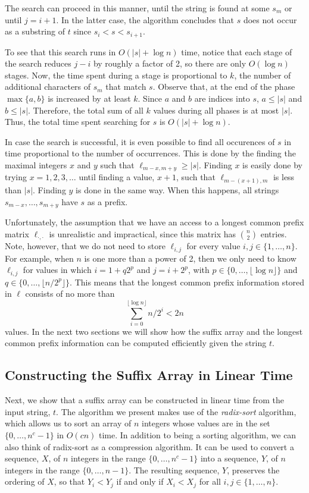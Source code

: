 The search can proceed in this manner, until the string is found at some
$s_m$ or until $j = i+1$. In the latter case, the algorithm concludes
that $s$ does not occur as a substring of $t$ since $s_{i} <s <s_{i+1}$.

To see that this search runs in $O(|s|+\log n)$ time, notice that each stage of the search reduces $j-i$ by roughly a factor of 2, so there are only $O(\log n)$ stages.  Now, the time spent during a stage is proportional to $k$, the number of additional characters of $s_m$ that match $s$.  Observe that, at the end of the phase $\max\{a,b\}$ is increased by at least $k$.  Since $a$ and $b$ are indices into $s$, $a\le|s|$ and $b\le|s|$. Therefore, the total sum of all $k$ values during all phases is at most $|s|$.  Thus, the total time spent searching for $s$ is $O(|s|+\log n)$.

In case the search is successful, it is even possible to find all
occurences of $s$ in time proportional to the number of occurrences.
This is done by the finding the maximal integers $x$ and $y$
such that $\ell_{m-x,m+y} \ge |s|$.  Finding $x$ is easily done
by trying $x=1,2,3,\ldots$ until finding a value, $x+1$, such that
$\ell_{m-(x+1),m}$ is less than $|s|$.  Finding $y$ is done in the
same way.  When this happens, all strings $s_{m-x},\ldots,s_{m+y}$
have $s$ as a prefix.

Unfortunately, the assumption that we have an access to a longest common
prefix matrix $\ell_{\cdot,\cdot}$ is unrealistic and impractical,
since this matrix has $\binom{n}{2}$ entries.  Note, however, that we do
not need to store $\ell_{i,j}$ for every value $i,j\in\{1,\ldots,n\}$.
For example, when $n$ is one more than a power of 2, then we only need
to know $\ell_{i,j}$ for values in which $i=1+q2^p$ and $j=i+2^{p}$, with
$p\in\{0,\ldots,\lfloor \log n\rfloor\}$ and $q\in\{0,\ldots,\lfloor
n/2^p\rfloor\}$. This means that the longest common prefix information
stored in $\ell$ consists of no more than
\[
  \sum_{i=0}^{\lfloor\log n\rfloor} n/2^i < 2n
\]
values.  In the next two sections we will show how the suffix array and the longest common prefix information can be computed efficiently given the string $t$.

\subsection{Constructing the Suffix Array in Linear Time}

Next, we show that a suffix array can be constructed in linear time
from the input string, $t$.  The algorithm we present makes use of the
\emph{radix-sort} algorithm, which allows us to sort an array of $n$
integers whose values are in the set $\{0,\ldots,n^c-1\}$ in $O(cn)$
time. In addition to being a sorting algorithm, we can also think of
radix-sort as a compression algorithm.  It can be used to convert
a sequence, $X$, of $n$ integers in the range $\{0,\ldots,n^c-1\}$
into a sequence, $Y$, of $n$ integers in the range $\{0,\ldots,n-1\}$.
The resulting sequence, $Y$, preserves the ordering of $X$, so that
$Y_i<Y_j$ if and only if $X_i<X_j$ for all $i,j\in\{1,\ldots,n\}$.

